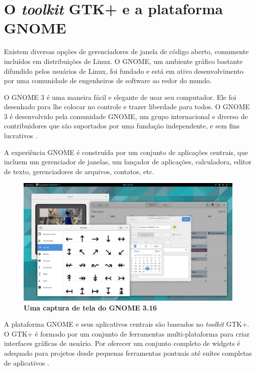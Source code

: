 \section{O \textit{toolkit} GTK+ e a plataforma GNOME}

Existem diversas opções de gerenciadores de janela de código aberto, comumente
incluídos em distribuições de Linux. O GNOME, um ambiente gráfico bastante
difundido pelos usuários de Linux, foi fundado e está em ativo desenvolvimento
por uma comunidade de engenheiros de software ao redor do mundo.

\begin{citacao}
    O GNOME 3 é uma maneira fácil e elegante de usar seu computador.
    Ele foi desenhado para lhe colocar no controle e trazer liberdade para
    todos. O GNOME 3 é desenvolvido pela comunidade GNOME, um grupo
    internacional e diverso de contribuidores que são suportados por uma
    fundação independente, e sem fins lucrativos \cite{gnome-org}.
\end{citacao}

A experiência GNOME é construída por um conjunto de aplicações centrais, que
incluem um gerenciador de janelas, um lançador de aplicações, calculadora,
editor de texto, gerenciadores de arquivos, contatos, etc.

\begin{figure}[!ht]
  \begin{center}
    \label{mclasen-new-apps}
    \caption{\textbf{Uma captura de tela do GNOME 3.16}}
    \includegraphics [width=\textwidth]{image/mclasen-new-apps.png}
  \end{center}
\end{figure}

A plataforma GNOME e seus aplicativos centrais são baseados no \textit{toolkit}
GTK+. O GTK+ é formado por um conjunto de ferramentas multi-plataforma para
criar interfaces gráficas de usuário. Por oferecer um conjunto completo de
widgets é adequado para projetos desde pequenas ferramentas pontuais até suítes
completas de aplicativos \cite{gtk-org}.

